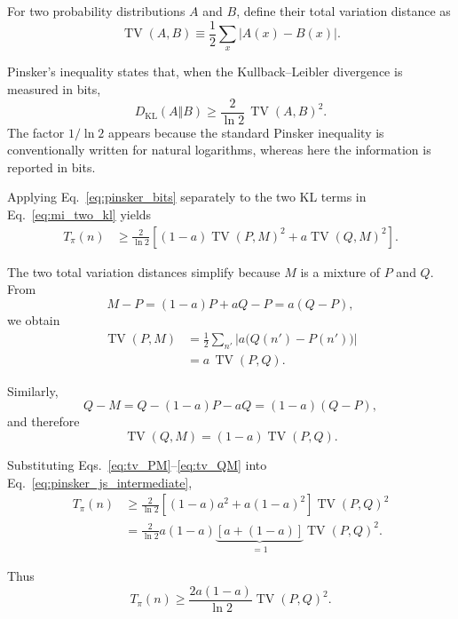 For two probability distributions \(A\) and \(B\), define their total
variation distance as
\begin{equation}
\operatorname{TV}(A,B)
\equiv
\frac{1}{2}
\sum_x
\left|A(x)-B(x)\right|.
\label{eq:tv_definition}
\end{equation}

Pinsker's inequality states that, when the Kullback--Leibler divergence
is measured in bits,
\begin{equation}
D_{\mathrm{KL}}(A\Vert B)
\ge
\frac{2}{\ln 2}\,
\operatorname{TV}(A,B)^2.
\label{eq:pinsker_bits}
\end{equation}
The factor \(1/\ln 2\) appears because the standard Pinsker inequality
is conventionally written for natural logarithms, whereas here the
information is reported in bits.

Applying Eq.~\eqref{eq:pinsker_bits} separately to the two KL terms in
Eq.~\eqref{eq:mi_two_kl} yields
\begin{align}
T_\pi(n)
&\ge
\frac{2}{\ln 2}
\left[
(1-a)\operatorname{TV}(P,M)^2
+
a\operatorname{TV}(Q,M)^2
\right].
\label{eq:pinsker_js_intermediate}
\end{align}

The two total variation distances simplify because \(M\) is a mixture
of \(P\) and \(Q\). From
\[
M-P
=
(1-a)P+aQ-P
=
a(Q-P),
\]
we obtain
\begin{align}
\operatorname{TV}(P,M)
&=
\frac12
\sum_{n'}
\left|
a\bigl(Q(n')-P(n')\bigr)
\right|
\nonumber\\
&=
a\,\operatorname{TV}(P,Q).
\label{eq:tv_PM}
\end{align}

Similarly,
\[
Q-M
=
Q-(1-a)P-aQ
=
(1-a)(Q-P),
\]
and therefore
\begin{equation}
\operatorname{TV}(Q,M)
=
(1-a)\operatorname{TV}(P,Q).
\label{eq:tv_QM}
\end{equation}

Substituting Eqs.~\eqref{eq:tv_PM}--\eqref{eq:tv_QM} into
Eq.~\eqref{eq:pinsker_js_intermediate},
\begin{align}
T_\pi(n)
&\ge
\frac{2}{\ln 2}
\left[
(1-a)a^2
+
a(1-a)^2
\right]
\operatorname{TV}(P,Q)^2
\nonumber\\
&=
\frac{2}{\ln 2}
a(1-a)
\underbrace{
\left[a+(1-a)\right]
}_{=1}
\operatorname{TV}(P,Q)^2.
\end{align}

Thus
\begin{equation}
\boxed{
T_\pi(n)
\ge
\frac{2a(1-a)}{\ln 2}
\operatorname{TV}(P,Q)^2.
}
\label{eq:js_tv_bound}
\end{equation}

